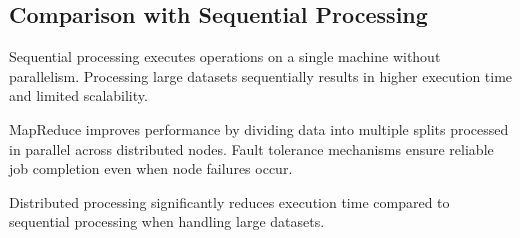 \documentclass[12pt,a4paper]{report}
\begin{document}
\subsection{Comparison with Sequential Processing}

Sequential processing executes operations on a single machine without parallelism.
Processing large datasets sequentially results in higher execution time and limited
scalability.

MapReduce improves performance by dividing data into multiple splits processed in
parallel across distributed nodes. Fault tolerance mechanisms ensure reliable job
completion even when node failures occur.

Distributed processing significantly reduces execution time compared to sequential
processing when handling large datasets.
\end{document}
